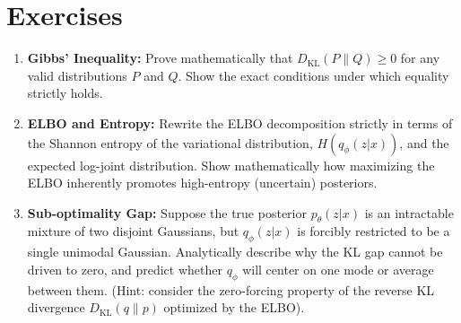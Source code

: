 \section*{Exercises}
\begin{enumerate}
    \item \textbf{Gibbs' Inequality:} Prove mathematically that $D_{\mathrm{KL}}(P \parallel Q) \geq 0$ for any valid distributions $P$ and $Q$. Show the exact conditions under which equality strictly holds.
    \item \textbf{ELBO and Entropy:} Rewrite the ELBO decomposition strictly in terms of the Shannon entropy of the variational distribution, $H(q_\phi(z|x))$, and the expected log-joint distribution. Show mathematically how maximizing the ELBO inherently promotes high-entropy (uncertain) posteriors.
    \item \textbf{Sub-optimality Gap:} Suppose the true posterior $p_\theta(z|x)$ is an intractable mixture of two disjoint Gaussians, but $q_\phi(z|x)$ is forcibly restricted to be a single unimodal Gaussian. Analytically describe why the KL gap cannot be driven to zero, and predict whether $q_\phi$ will center on one mode or average between them. (Hint: consider the zero-forcing property of the reverse KL divergence $D_{\mathrm{KL}}(q \parallel p)$ optimized by the ELBO).
\end{enumerate}

